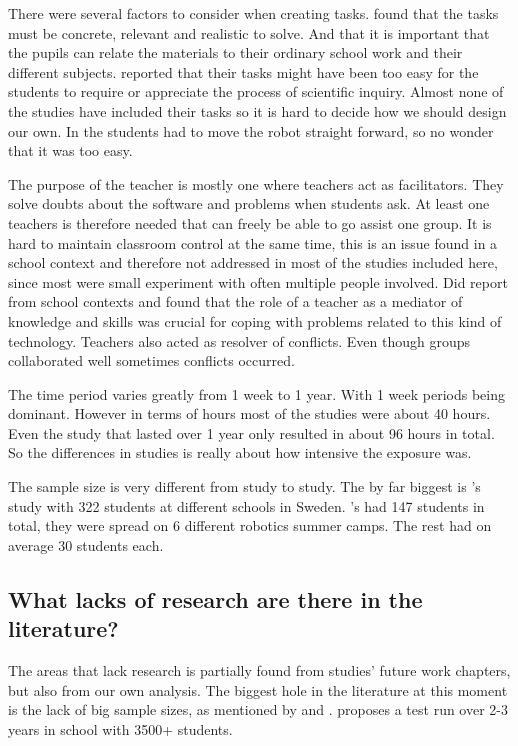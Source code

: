 \bigskip\noindent
There were several factors to consider when creating tasks.  found that the tasks must be concrete, relevant and realistic  to solve. And that it is important that the pupils can relate the materials to their ordinary school work and their different subjects.  reported that their tasks might have been too easy for the students to require or appreciate the process of  scientific inquiry. Almost none of the studies have included their tasks so it is hard to decide how we should design our own. In  the students had to move the robot straight forward, so no wonder that it was too easy.

\bigskip\noindent
The purpose of the teacher is mostly one where teachers act as facilitators. They solve doubts about the software and problems when students ask. At least one teachers is therefore needed that can freely be able to go assist one group. It is hard to maintain classroom control at the same time, this is an issue found in a school context and therefore not addressed in most of the studies included here, since most were small experiment with often multiple people involved.  Did report from school contexts and found that the role of a teacher as a mediator of knowledge and skills was crucial for coping with problems related to this kind of technology. Teachers also acted as resolver of conflicts. Even though groups collaborated well sometimes conflicts occurred. 

\bigskip\noindent
The time period varies greatly from 1 week to 1 year. With 1 week periods being dominant. However in terms of hours most of the studies were about 40 hours. Even the study that lasted over 1 year only resulted in about 96 hours in total. So the differences in studies is really about how intensive the exposure was. 

\bigskip\noindent
The sample size is very different from study to study. The by far biggest is 's study with 322 students at different schools in Sweden. 's had 147 students in total, they were spread on 6 different robotics summer camps. The rest had on average 30 students each.

\subsection*{What lacks of research are there in the literature?}

The areas that lack research is partially found from studies' future work chapters, but also from our own analysis. The biggest hole in the literature at this moment is the lack of big sample sizes, as mentioned by  and . 
 proposes a test run over 2-3 years in school with 3500+ students. 

